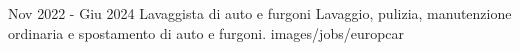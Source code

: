 {Nov 2022 - Giu 2024}
{Lavaggista di auto e furgoni}
{Lavaggio, pulizia, manutenzione ordinaria e spostamento di auto e furgoni.}
{images/jobs/europcar}
